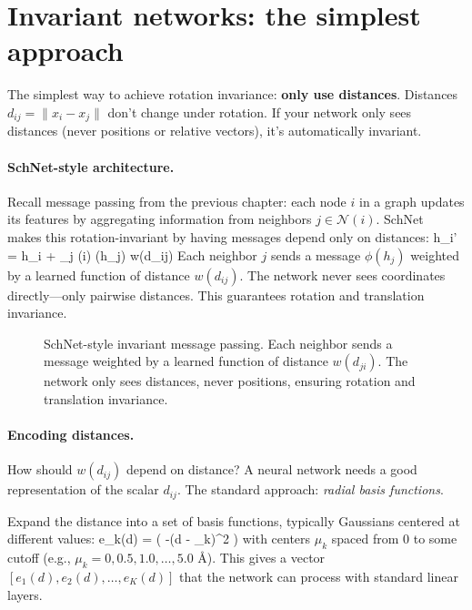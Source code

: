 \documentclass[11pt]{article}
\begin{document}
\section{Invariant networks: the simplest approach}

The simplest way to achieve rotation invariance: \textbf{only use distances}. Distances $d_{ij} = \|x_i - x_j\|$ don't change under rotation. If your network only sees distances (never positions or relative vectors), it's automatically invariant.

\paragraph{SchNet-style architecture.} Recall message passing from the previous chapter: each node $i$ in a graph updates its features by aggregating information from neighbors $j \in \mathcal{N}(i)$. SchNet~\cite{schutt2017schnet} makes this rotation-invariant by having messages depend only on distances:
\beq
h_i' = h_i + \sum_{j \in {}(i)} \phi(h_j) \cdot w(d_{ij})
\eeq
Each neighbor $j$ sends a message $\phi(h_j)$ weighted by a learned function of distance $w(d_{ij})$. The network never sees coordinates directly---only pairwise distances. This guarantees rotation and translation invariance.

\begin{figure}[h]
\centering

\caption{SchNet-style invariant message passing. Each neighbor sends a message weighted by a learned function of distance $w(d_{ji})$. The network only sees distances, never positions, ensuring rotation and translation invariance.}
\label{fig:schnet}
\end{figure}

\paragraph{Encoding distances.} How should $w(d_{ij})$ depend on distance? A neural network needs a good representation of the scalar $d_{ij}$. The standard approach: \emph{radial basis functions}.

Expand the distance into a set of basis functions, typically Gaussians centered at different values:
\beq
e_k(d) = \exp\left( -\gamma (d - \mu_k)^2 \right)
\eeq
with centers $\mu_k$ spaced from 0 to some cutoff (e.g., $\mu_k = 0, 0.5, 1.0, \ldots, 5.0$ \AA). This gives a vector $[e_1(d), e_2(d), \ldots, e_K(d)]$ that the network can process with standard linear layers.
\end{document}
